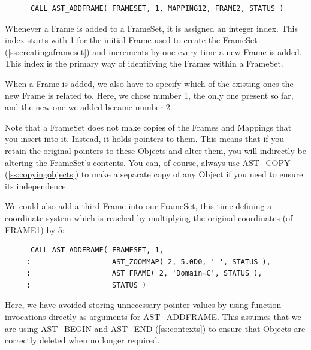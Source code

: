 \documentclass[twoside,11pt]{article}
\newcommand{\htmlref}[2]{#1}
\newcommand{\secref}[1]{\S\ref{#1}}
\renewcommand{\secref}[1]{\ref{#1}}
\begin{document}
\small
\begin{verbatim}
      CALL AST_ADDFRAME( FRAMESET, 1, MAPPING12, FRAME2, STATUS )
\end{verbatim}
\normalsize

Whenever a Frame is added to a FrameSet, it is assigned an integer
index. This index starts with 1 for the initial Frame used to create
the FrameSet (\secref{ss:creatingaframeset}) and increments by one
every time a new Frame is added. This index is the primary way of
identifying the Frames within a FrameSet.

When a Frame is added, we also have to specify which of the existing
ones the new Frame is related to. Here, we chose number 1, the only
one present so far, and the new one we added became number 2.

Note that a FrameSet does not make copies of the Frames and Mappings
that you insert into it. Instead, it holds pointers to them. This
means that if you retain the original pointers to these Objects and
alter them, you will indirectly be altering the FrameSet's
contents. You can, of course, always use \htmlref{AST\_COPY}{AST_COPY}
(\secref{ss:copyingobjects}) to make a separate copy of any \htmlref{Object}{Object} if
you need to ensure its independence.

We could also add a third Frame into our FrameSet, this time defining
a coordinate system which is reached by multiplying the original
coordinates (of FRAME1) by 5:

\small
\begin{verbatim}
      CALL AST_ADDFRAME( FRAMESET, 1,
     :                   AST_ZOOMMAP( 2, 5.0D0, ' ', STATUS ),
     :                   AST_FRAME( 2, 'Domain=C', STATUS ),
     :                   STATUS )
\end{verbatim}
\normalsize

Here, we have avoided storing unnecessary pointer values by using
function invocations directly as arguments for AST\_ADDFRAME. This
assumes that we are using \htmlref{AST\_BEGIN}{AST_BEGIN} and \htmlref{AST\_END}{AST_END}
(\secref{ss:contexts}) to ensure that Objects are correctly deleted
when no longer required.
\end{document}
